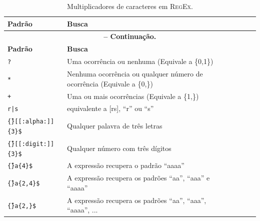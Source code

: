 \begin{refsection}
\begin{center}
\begin{longtable}{lllllll}
\end{longtable}
\end{center}


\pagestyle{fancy}
\begin{center}

\begin{longtable}{lllllll}
\caption[Tabela \ref{tut2:table:multiple}:Multiplicadores em \textsc{RegEx}]{Multiplicadores de caracteres em \textsc{RegEx}.} \label{tut2:table:multiple} \\


\hline\hline \textbf{Padrão} & \textbf{Busca}\\
\endfirsthead

\multicolumn{6}{c}{{\bfseries \tablename\ \thetable{} -- Continuação.}}\\
\hline\hline \textbf{Padrão} & \textbf{Busca}\\
\endhead
\hline \hline
\endlastfoot
\texttt{?} & Uma ocorrência ou nenhuma (Equivale a \{0,1\})\\
\texttt{*} & Nenhuma ocorrência ou qualquer número de ocorrência (Equivale a \{0,\})\\
\texttt{+} & Uma ou mais ocorrências (Equivale a \{1,\})\\
\texttt{r|s} & equivalente a [rs], ``r'' ou ``s''\\
\texttt{\^\{\}[[:alpha:]]\{3\}\$} & Qualquer palavra de três letras\\
\texttt{\^\{\}[[:digit:]]\{3\}\$}  & Qualquer número com três dígitos\\
\texttt{\^\{\}a\{4\}\$} & A expressão recupera o padrão ``aaaa''\\
\texttt{\^\{\}a\{2,4\}\$} & A expressão recupera os padrões ``aa'', ``aaa'' e ``aaaa''\\
\texttt{\^\{\}a\{2,\}\$} & A expressão recupera os padrões ``aa'', ``aaa'', ``aaaa'', ...\\

\end{longtable}
\end{center}


\end{refsection}
